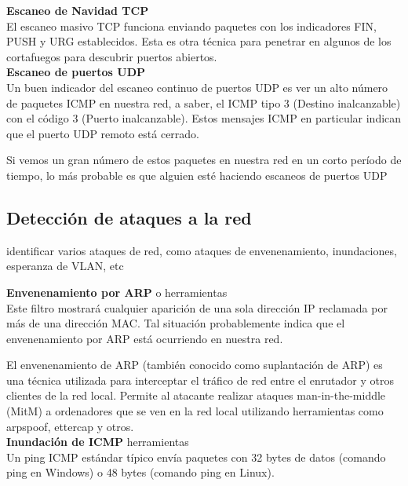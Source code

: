 \textbf{Escaneo de Navidad TCP}		\\
El escaneo masivo TCP funciona enviando paquetes con los indicadores FIN, PUSH y URG establecidos. Esta es otra técnica para penetrar en algunos de los cortafuegos para descubrir puertos abiertos.\\


\textbf{Escaneo de puertos UDP}		\\
Un buen indicador del escaneo continuo de puertos UDP es ver un alto número de paquetes ICMP en nuestra red, a saber, el ICMP tipo 3 (Destino inalcanzable) con el código 3 (Puerto inalcanzable). Estos mensajes ICMP en particular indican que el puerto UDP remoto está cerrado.

Si vemos un gran número de estos paquetes en nuestra red en un corto período de tiempo, lo más probable es que alguien esté haciendo escaneos de puertos UDP 

\subsection{Detección de ataques a la red}
identificar varios ataques de red, como ataques de envenenamiento, inundaciones, esperanza de VLAN, etc

\textbf{Envenenamiento por ARP}	 o  herramientas	\\
Este filtro mostrará cualquier aparición de una sola dirección IP reclamada por más de una dirección MAC. Tal situación probablemente indica que el envenenamiento por ARP está ocurriendo en nuestra red.

El envenenamiento de ARP (también conocido como suplantación de ARP) es una técnica utilizada para interceptar el tráfico de red entre el enrutador y otros clientes de la red local. Permite al atacante realizar ataques man-in-the-middle (MitM) a ordenadores que se ven en la red local utilizando herramientas como arpspoof, ettercap y otros.\\



\textbf{Inundación de ICMP	}  herramientas	\\
Un ping ICMP estándar típico envía paquetes con 32 bytes de datos (comando ping en Windows) o 48 bytes (comando ping en Linux).

